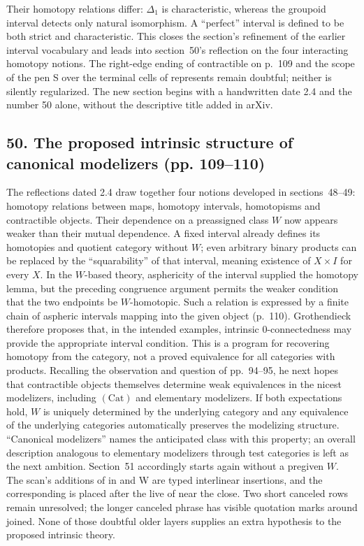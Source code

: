 \documentclass[10pt,oneside]{book}
\begin{document}
Their homotopy relations differ: $\Delta_1$ is characteristic, whereas the groupoid interval detects only natural isomorphism. A ``perfect'' interval is defined to be both strict and characteristic. This closes the section's refinement of the earlier interval vocabulary and leads into section~50's reflection on the four interacting homotopy notions. The right-edge ending of contractible on p.~109 and the scope of the pen S over the terminal cells of represents remain doubtful; neither is silently regularized. The new section begins with a handwritten date 2.4 and the number 50 alone, without the descriptive title added in arXiv.

\subsection*{50. The proposed intrinsic structure of canonical modelizers (pp. 109--110)}
The reflections dated 2.4 draw together four notions developed in sections~48--49: homotopy relations between maps, homotopy intervals, homotopisms and contractible objects. Their dependence on a preassigned class $W$ now appears weaker than their mutual dependence. A fixed interval already defines its homotopies and quotient category without $W$; even arbitrary binary products can be replaced by the ``squarability'' of that interval, meaning existence of $X\times I$ for every $X$. In the $W$-based theory, asphericity of the interval supplied the homotopy lemma, but the preceding congruence argument permits the weaker condition that the two endpoints be $W$-homotopic. Such a relation is expressed by a finite chain of aspheric intervals mapping into the given object (p.~110). Grothendieck therefore proposes that, in the intended examples, intrinsic $0$-connectedness may provide the appropriate interval condition. This is a program for recovering homotopy from the category, not a proved equivalence for all categories with products. Recalling the observation and question of pp.~94--95, he next hopes that contractible objects themselves determine weak equivalences in the nicest modelizers, including $(\mathrm{Cat})$ and elementary modelizers. If both expectations hold, $W$ is uniquely determined by the underlying category and any equivalence of the underlying categories automatically preserves the modelizing structure. ``Canonical modelizers'' names the anticipated class with this property; an overall description analogous to elementary modelizers through test categories is left as the next ambition. Section~51 accordingly starts again without a pregiven $W$. The scan's additions of in and W are typed interlinear insertions, and the corresponding is placed after the live of near the close. Two short canceled rows remain unresolved; the longer canceled phrase has visible quotation marks around joined. None of those doubtful older layers supplies an extra hypothesis to the proposed intrinsic theory.
\end{document}
